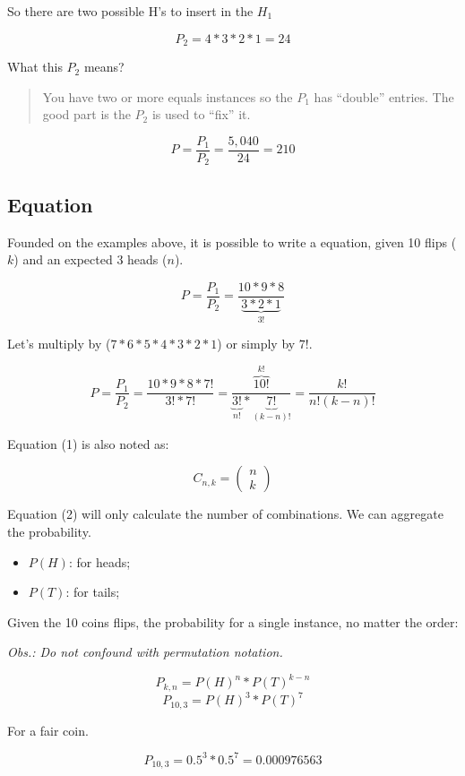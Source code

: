 \documentclass[]{book}
\providecommand{\tightlist}{%
  \setlength{\itemsep}{0pt}\setlength{\parskip}{0pt}}
\begin{document}
So there are two possible H's to insert in the \(H_1\)

\[ P_2 = 4 * 3 * 2 * 1 = 24 \]

What this \(P_2\) means?

\begin{quote}
You have two or more equals instances so the \(P_1\) has ``double''
entries. The good part is the \(P_2\) is used to ``fix'' it.
\end{quote}

\[ P = \frac{P_1}{P_2} = \frac{5,040}{24} = 210 \]

\subsection{Equation}\label{equation}

Founded on the examples above, it is possible to write a equation, given
10 flips (\(k\)) and an expected 3 heads (\(n\)).

\[ P = \frac{P_1}{P_2} = \frac{10 * 9 * 8}{\underbrace{3 * 2 * 1}_{3!}}\]

Let's multiply by (\(7 * 6 * 5 * 4 * 3 * 2 * 1\)) or simply by \(7!\).

\[ P = \frac{P_1}{P_2} = \frac{10 * 9 * 8 * 7!}{3! * 7!} = \frac{\overbrace{10!}^{k!}}{\underbrace{3!}_{n!} * \underbrace{7!}_{(k-n)!}} = \frac{k!}{n!(k-n)!} \tag{1}\]

Equation (1) is also noted as:

\[ C_{n,k} = \begin{pmatrix} n \\ k \end{pmatrix} \tag{2}\]

Equation (2) will only calculate the number of combinations. We can
aggregate the probability.

\begin{itemize}
\tightlist
\item
  \(P(H)\): for heads;
\item
  \(P(T)\): for tails;
\end{itemize}

Given the 10 coins flips, the probability for a single instance, no
matter the order:

\emph{Obs.: Do not confound with permutation notation.}

\[ P_{k,n} = P(H)^n * P(T)^{k-n}\]
\[ P_{10,3} = P(H)^3 * P(T)^{7}\tag{3}\]

For a fair coin.

\[ P_{10,3} = 0.5^3 * 0.5^{7} = 0.000976563 \tag{4}\]
\end{document}

